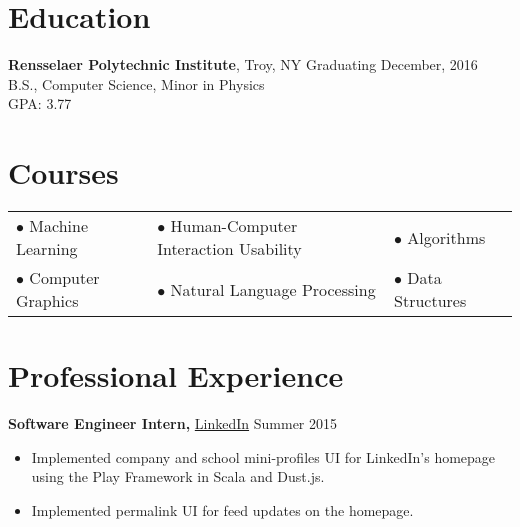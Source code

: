 \documentclass[margin]{res}
\begin{document}
\begin{minipage}{\textwidth}


\begin{resume}

\section{Education}
{\bf Rensselaer Polytechnic Institute}, Troy, NY \hfill Graduating December, 2016 \\
B.S., Computer Science, Minor in Physics \\
GPA: 3.77

\section{Courses}
\begin{tabular}{lll}
$\bullet$ Machine Learning & $\bullet$ Human-Computer Interaction Usability & $\bullet$ Algorithms \\
$\bullet$ Computer Graphics & $\bullet$ Natural Language Processing & $\bullet$ Data Structures \\
\end{tabular}

\section{Professional Experience}
{\bf Software Engineer Intern,} \uline{LinkedIn} \hfill Summer 2015
 \begin{itemize} \itemsep -2pt %
 \item Implemented company and school mini-profiles UI for LinkedIn's homepage using the Play Framework in Scala and Dust.js.
 \item Implemented permalink UI for feed updates on the homepage.
 \end{itemize}




\end{resume}
\end{minipage}
\end{document}
